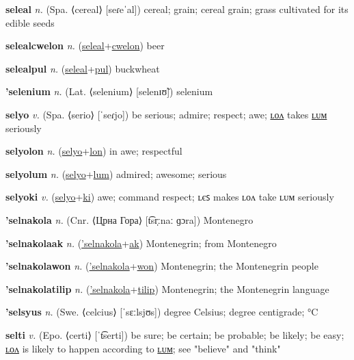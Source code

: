 \textbf{\hypertarget{seleal}{seleal}} \textit{n.} (Spa. ⟨cereal⟩ [seɾeˈal])
cereal; grain; cereal grain; grass cultivated for its edible seeds

\textbf{\hypertarget{selealcwelon}{selealcwelon}} \textit{n.} (\hyperlink{seleal}{seleal}+\allowbreak \hyperlink{cwelon}{cwelon})
beer

\textbf{\hypertarget{selealpul}{selealpul}} \textit{n.} (\hyperlink{seleal}{seleal}+\allowbreak \hyperlink{pul}{pul})
buckwheat

\textbf{\hypertarget{'selenium}{'selenium}} \textit{n.} (Lat. ⟨selenium⟩ [selenɪʊ̃])
selenium

\textbf{\hypertarget{selyo}{selyo}} \textit{v.} (Spa. ⟨serio⟩ [ˈseɾjo])
be serious; admire; respect; awe; \hyperlink{selyolon}{ʟᴏᴧ} takes \hyperlink{selyolum}{ʟᴜᴍ} seriously

\textbf{\hypertarget{selyolon}{selyolon}} \textit{n.} (\hyperlink{selyo}{selyo}+\allowbreak \hyperlink{lon}{lon})
in awe; respectful

\textbf{\hypertarget{selyolum}{selyolum}} \textit{n.} (\hyperlink{selyo}{selyo}+\allowbreak \hyperlink{lum}{lum})
admired; awesome; serious

\textbf{\hypertarget{selyoki}{selyoki}} \textit{v.} (\hyperlink{selyo}{selyo}+\allowbreak \hyperlink{ki}{ki})
awe; command respect; ʟєꜱ makes ʟᴏᴧ take ʟᴜᴍ seriously

\textbf{\hypertarget{'selnakola}{'selnakola}} \textit{n.} (Cnr. ⟨Црна Гора⟩ [t͡sr̩ːnaː ɡɔra])
Montenegro

\textbf{\hypertarget{'selnakolaak}{'selnakolaak}} \textit{n.} (\hyperlink{'selnakola}{'selnakola}+\allowbreak \hyperlink{ak}{ak})
Montenegrin; from Montenegro

\textbf{\hypertarget{'selnakolawon}{'selnakolawon}} \textit{n.} (\hyperlink{'selnakola}{'selnakola}+\allowbreak \hyperlink{won}{won})
Montenegrin; the Montenegrin people

\textbf{\hypertarget{'selnakolatilip}{'selnakolatilip}} \textit{n.} (\hyperlink{'selnakola}{'selnakola}+\allowbreak \hyperlink{tilip}{tilip})
Montenegrin; the Montenegrin language

\textbf{\hypertarget{'selsyus}{'selsyus}} \textit{n.} (Swe. ⟨celcius⟩ [ˈsɛːlsjʊs])
degree Celsius; degree centigrade; °C

\textbf{\hypertarget{selti}{selti}} \textit{v.} (Epo. ⟨certi⟩ [ˈt͡serti])
be sure; be certain; be probable; be likely; be easy; \hyperlink{seltilon}{ʟᴏᴧ} is likely to happen according to \hyperlink{seltilum}{ʟᴜᴍ}; see "believe" and "think"

